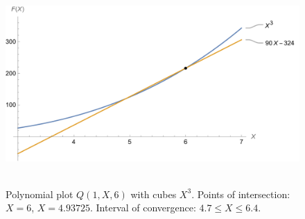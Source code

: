 ﻿\begin{figure}[H]
    \centering
    \includegraphics[width=1\textwidth]{sections/images/02_plots_polynomial_q1_n6_with_cubes}
    ~\caption{Polynomial plot $Q(1, X, 6)$ with cubes $X^3$.
    Points of intersection: $X=6$, $X=4.93725$.
    Interval of convergence: $4.7 \leq X \leq 6.4$.
    }\label{fig:figure8}
\end{figure}
